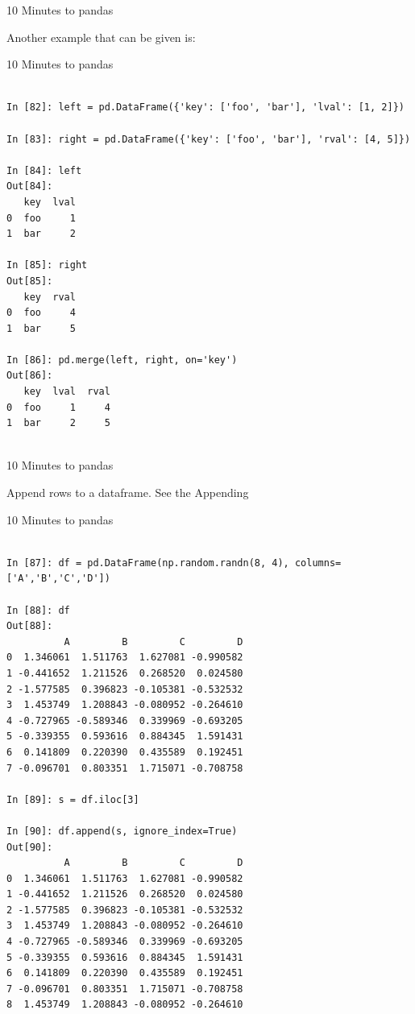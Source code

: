 \documentclass{beamer}
\begin{document}
\begin{frame}[t]{10 Minutes to pandas}

Another example that can be given is:

\end{frame}


\begin{frame}[t,fragile]{10 Minutes to pandas}


	\scriptsize
\begin{verbatim}

In [82]: left = pd.DataFrame({'key': ['foo', 'bar'], 'lval': [1, 2]})

In [83]: right = pd.DataFrame({'key': ['foo', 'bar'], 'rval': [4, 5]})

In [84]: left
Out[84]: 
   key  lval
0  foo     1
1  bar     2

In [85]: right
Out[85]: 
   key  rval
0  foo     4
1  bar     5

In [86]: pd.merge(left, right, on='key')
Out[86]: 
   key  lval  rval
0  foo     1     4
1  bar     2     5


\end{verbatim}


\end{frame}


\begin{frame}[t]{10 Minutes to pandas}

Append rows to a dataframe. See the Appending

\end{frame}


\begin{frame}[t,fragile]{10 Minutes to pandas}


	\scriptsize
\begin{verbatim}

In [87]: df = pd.DataFrame(np.random.randn(8, 4), columns=['A','B','C','D'])

In [88]: df
Out[88]: 
          A         B         C         D
0  1.346061  1.511763  1.627081 -0.990582
1 -0.441652  1.211526  0.268520  0.024580
2 -1.577585  0.396823 -0.105381 -0.532532
3  1.453749  1.208843 -0.080952 -0.264610
4 -0.727965 -0.589346  0.339969 -0.693205
5 -0.339355  0.593616  0.884345  1.591431
6  0.141809  0.220390  0.435589  0.192451
7 -0.096701  0.803351  1.715071 -0.708758

In [89]: s = df.iloc[3]

In [90]: df.append(s, ignore_index=True)
Out[90]: 
          A         B         C         D
0  1.346061  1.511763  1.627081 -0.990582
1 -0.441652  1.211526  0.268520  0.024580
2 -1.577585  0.396823 -0.105381 -0.532532
3  1.453749  1.208843 -0.080952 -0.264610
4 -0.727965 -0.589346  0.339969 -0.693205
5 -0.339355  0.593616  0.884345  1.591431
6  0.141809  0.220390  0.435589  0.192451
7 -0.096701  0.803351  1.715071 -0.708758
8  1.453749  1.208843 -0.080952 -0.264610


\end{verbatim}


\end{frame}
\end{document}
